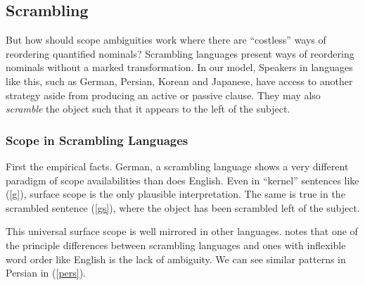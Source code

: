 \documentclass{article}
\begin{document}
\subsection{Scrambling\label{scramb}}

But how should scope ambiguities work where there are ``costless'' ways of reordering quantified nominals? Scrambling languages present ways of reordering nominals without a marked transformation. In our model, Speakers in languages like this, such as German, Persian, Korean and Japanese, have access to another strategy aside from producing an active or passive clause. They may also \emph{scramble} the object such that it appears to the left of the subject.

\subsubsection{Scope in Scrambling Languages}

First the empirical facts. German, a scrambling language shows a very different paradigm of scope availabilities than does English. Even in ``kernel'' sentences like (\ref{g}), surface scope is the only plausible interpretation. The same is true in the scrambled sentence (\ref{gs}), where the object has been scrambled left of the subject.

\begin{exe}
\end{exe}

This universal surface scope is well mirrored in other languages. \textcite{karimi03} notes that one of the principle differences between scrambling languages and ones with inflexible word order like English is the lack of ambiguity. We can see similar patterns in Persian in (\ref{pers}).

\begin{exe}
\ex\label{pers} \begin{xlist}
\end{xlist}\end{exe}
\end{document}
